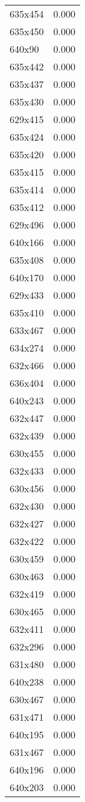 \begin{table}
\begin{tabular}{lr}
635x454 & 0.000 \\
635x450 & 0.000 \\
640x90 & 0.000 \\
635x442 & 0.000 \\
635x437 & 0.000 \\
635x430 & 0.000 \\
629x415 & 0.000 \\
635x424 & 0.000 \\
635x420 & 0.000 \\
635x415 & 0.000 \\
635x414 & 0.000 \\
635x412 & 0.000 \\
629x496 & 0.000 \\
640x166 & 0.000 \\
635x408 & 0.000 \\
640x170 & 0.000 \\
629x433 & 0.000 \\
635x410 & 0.000 \\
633x467 & 0.000 \\
634x274 & 0.000 \\
632x466 & 0.000 \\
636x404 & 0.000 \\
640x243 & 0.000 \\
632x447 & 0.000 \\
632x439 & 0.000 \\
630x455 & 0.000 \\
632x433 & 0.000 \\
630x456 & 0.000 \\
632x430 & 0.000 \\
632x427 & 0.000 \\
632x422 & 0.000 \\
630x459 & 0.000 \\
630x463 & 0.000 \\
632x419 & 0.000 \\
630x465 & 0.000 \\
632x411 & 0.000 \\
632x296 & 0.000 \\
631x480 & 0.000 \\
640x238 & 0.000 \\
630x467 & 0.000 \\
631x471 & 0.000 \\
640x195 & 0.000 \\
631x467 & 0.000 \\
640x196 & 0.000 \\
640x203 & 0.000 \\

\end{tabular}
\end{table}
